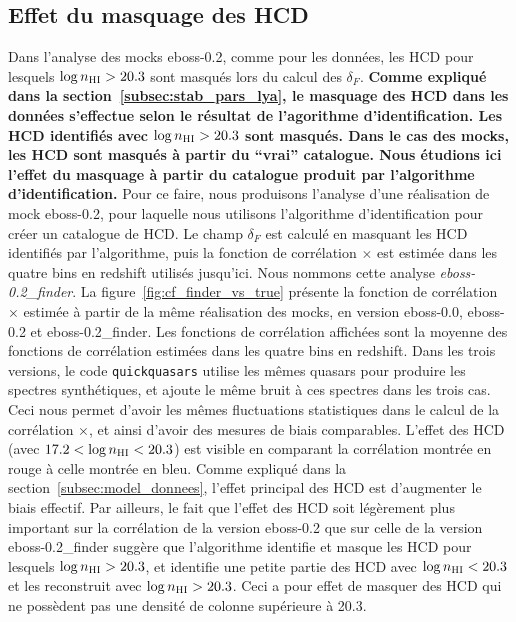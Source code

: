 \documentclass[11pt, twoside, a4paper, openright]{report}
\begin{document}
\subsection{Effet du masquage des HCD}
\label{subsec:effet_masquage_hcd}
Dans l'analyse des mocks eboss-0.2, comme pour les données, les HCD pour lesquels $\log n_{\textsc{HI}} > \num{20.3}$ sont masqués lors du calcul des $\delta_F$.
\textbf{Comme expliqué dans la section~\ref{subsec:stab_pars_lya}, le masquage des HCD dans les données s'effectue selon le résultat de l'agorithme d'identification. Les HCD identifiés avec $\log n_{\textsc{HI}} > \num{20.3}$ sont masqués. Dans le cas des mocks, les HCD sont masqués à partir du ``vrai'' catalogue. Nous étudions ici l'effet du masquage à partir du catalogue produit par l'algorithme d'identification.}
Pour ce faire, nous produisons l'analyse d'une réalisation de mock eboss-0.2, pour laquelle nous utilisons l'algorithme d'identification pour créer un catalogue de HCD. Le champ $\delta_F$ est calculé en masquant les HCD identifiés par l'algorithme, puis la fonction de corrélation \lya{}$\times$\lya{} est estimée dans les quatre bins en redshift utilisés jusqu'ici. Nous nommons cette analyse \emph{eboss-0.2\_finder}.
La figure~\ref{fig:cf_finder_vs_true} présente la fonction de corrélation \lya{}$\times$\lya{} estimée à partir de la même réalisation des mocks, en version eboss-0.0, eboss-0.2 et eboss-0.2\_finder.
Les fonctions de corrélation affichées sont la moyenne des fonctions de corrélation estimées dans les quatre bins en redshift.
Dans les trois versions, le code \texttt{quickquasars} utilise les mêmes quasars pour produire les spectres synthétiques, et ajoute le même bruit à ces spectres dans les trois cas. Ceci nous permet d'avoir les mêmes fluctuations statistiques dans le calcul de la corrélation \lya{}$\times$\lya{}, et ainsi d'avoir des mesures de biais comparables.
L'effet des HCD (avec $\num{17.2} < \log n_{\textsc{HI}} < \num{20.3}$) est visible en comparant la corrélation montrée en rouge à celle montrée en bleu. Comme expliqué dans la section~\ref{subsec:model_donnees}, l'effet principal des HCD est d'augmenter le biais effectif.
Par ailleurs, le fait que l'effet des HCD soit légèrement plus important sur la corrélation de la version eboss-0.2 que sur celle de la version  eboss-0.2\_finder suggère que l'algorithme identifie et masque les HCD pour lesquels $\log n_{\textsc{HI}} > \num{20.3}$, et identifie une petite partie des HCD avec $\log n_{\textsc{HI}} < \num{20.3}$ et les reconstruit avec $\log n_{\textsc{HI}} > \num{20.3}$. Ceci a pour effet de masquer des HCD qui ne possèdent pas une densité de colonne supérieure à \num{20.3}.
\end{document}
